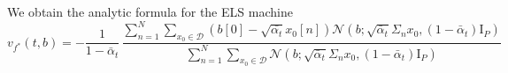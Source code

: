 \documentclass[a4paper,10pt]{article}
\theoremstyle{definition} %
\theoremstyle{definition} %
\theoremstyle{definition} %
\theoremstyle{definition} %
\newcommand{\R}{\mathbb{R}}
\newcommand{\Normal}[1]{\mathcal{N}\left( {#1} \right)}
\newcommand{\Id}{\mathrm{I}}
\newcommand{\0}{\boldsymbol{0}}
\begin{document}
We obtain the analytic formula for the ELS machine 
\begin{equation*}
    v_{f^*}(t,b) = -\frac{1}{1-\bar\alpha_t}\,\frac{\sum_{n=1}^{N}\sum_{x_0  \in \mathcal{D}} \left(b[0] -  \sqrt{\bar{\alpha_t}}x_0[n]\right) \Normal{b; \sqrt{\bar \alpha_t} \Sigma_n x_0, (1-\bar\alpha_t) \Id_P}}{\sum_{n=1}^{N}\sum_{x_0  \in \mathcal{D}} \Normal{b; \sqrt{\bar \alpha_t} \Sigma_n x_0, (1-\bar\alpha_t) \Id_P}}
\end{equation*}






\end{document}
